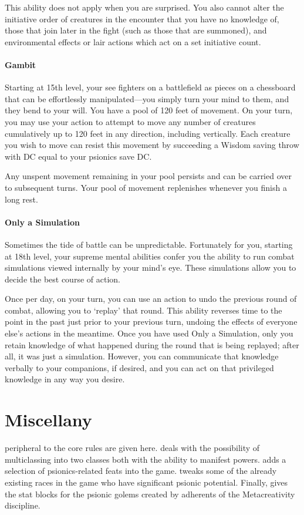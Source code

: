 This ability does not apply when you are surprised.
You also cannot alter the initiative order of creatures
in the encounter that you have no knowledge of,
those that join later in the fight (such as those
that are summoned),
and environmental effects or lair actions
which act on a set initiative count.

\subsubsection{Gambit}
Starting at 15th level,
your see fighters on a battlefield as pieces on a chessboard
that can be effortlessly manipulated---you simply turn your
mind to them, and they bend to your will.
You have a pool of 120 feet of movement.
On your turn,
you may use your action to attempt to move any number of creatures
cumulatively up to 120 feet in any direction,
including vertically.
Each creature you wish to move can resist this movement by
succeeding a Wisdom saving throw with DC equal to your
psionics save DC.

Any unspent movement remaining in your pool persists
and can be carried over to subsequent turns.
Your pool of movement replenishes whenever you finish a long rest.

\subsubsection{Only a Simulation}
Sometimes the tide of battle can be unpredictable.
Fortunately for you,
starting at 18th level,
your supreme mental abilities confer you the ability to
run combat simulations viewed internally by your mind's eye.
These simulations allow you to decide the best course of action.

Once per day, on your turn,
you can use an action to undo the previous round of combat,
allowing you to `replay' that round.
This ability reverses time to the point in the past
just prior to your previous turn,
undoing the effects of everyone else's actions in the meantime.
Once you have used Only a Simulation,
only you retain knowledge of what happened during the round
that is being replayed; after all, it was just a simulation.
However, you can communicate that knowledge verbally to your companions,
if desired,
and you can act on that privileged knowledge
in any way you desire.

\chapter{Miscellany}
\label{chap:miscellany}
peripheral to the core rules are given here.
 deals with the
possibility of multiclassing into two classes both with
the ability to manifest powers.
 adds a selection of psionics-related
feats into the game.
 tweaks some of the already existing
races in the game who have significant psionic potential.
Finally,
 gives the stat blocks for the
psionic golems created by adherents of the
Metacreativity discipline.

